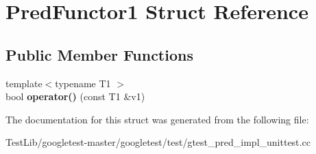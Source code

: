 \hypertarget{structPredFunctor1}{}\section{Pred\+Functor1 Struct Reference}
\label{structPredFunctor1}
\subsection*{Public Member Functions}
\begin{DoxyCompactItemize}
\item 
\mbox{\label{structPredFunctor1_a78d81d1bac0ee7f81ea631c49bfab3e2}} 
{\footnotesize template$<$typename T1 $>$ }\\bool {\bfseries operator()} (const T1 \&v1)
\end{DoxyCompactItemize}


The documentation for this struct was generated from the following file\+:\begin{DoxyCompactItemize}
\item 
Test\+Lib/googletest-\/master/googletest/test/gtest\+\_\+pred\+\_\+impl\+\_\+unittest.\+cc\end{DoxyCompactItemize}
